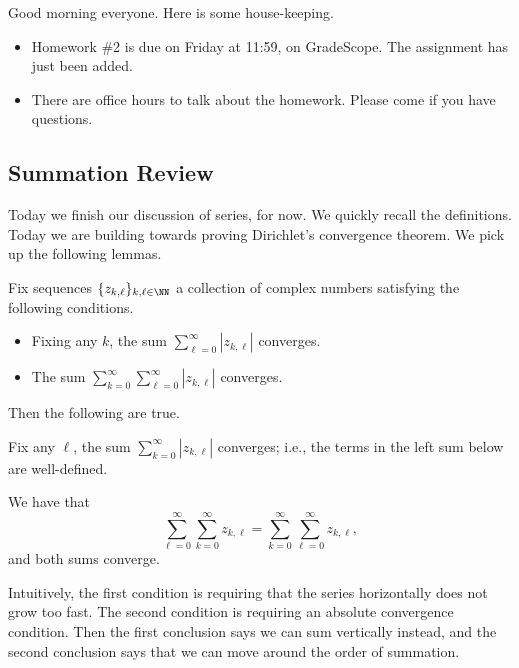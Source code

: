 \documentclass[../notes.tex]{subfiles}
\begin{document}

Good morning everyone. Here is some house-keeping.
\begin{itemize}
	\item Homework \#2 is due on Friday at 11:59, on GradeScope. The assignment has just been added.
	\item There are office hours to talk about the homework. Please come if you have questions.
\end{itemize}

\subsection{Summation Review}
Today we finish our discussion of series, for now. We quickly recall the definitions.
\seriesdefi*
\convergedefi*
Today we are building towards proving Dirichlet's convergence theorem. We pick up the following lemmas.
\begin{lemma} \label{lem:doublesums}
	Fix sequences $\{z_{k,\ell}\}_{k,\ell\in\NN}$ a collection of complex numbers satisfying the following conditions.
	\begin{itemize}
		\item Fixing any $k$, the sum $\sum_{\ell=0}^\infty|z_{k,\ell}|$ converges.
		\item The sum $\sum_{k=0}^\infty\sum_{\ell=0}^\infty|z_{k,\ell}|$ converges.
	\end{itemize}
	Then the following are true.
	\begin{listalph}
		\item Fix any $\ell$, the sum $\sum_{k=0}^\infty|z_{k,\ell}|$ converges; i.e., the terms in the left sum below are well-defined.
		\item We have that
		\[\sum_{\ell=0}^\infty\sum_{k=0}^\infty z_{k,\ell}=\sum_{k=0}^\infty\sum_{\ell=0}^\infty z_{k,\ell},\]
		and both sums converge.
	\end{listalph}
\end{lemma}
Intuitively, the first condition is requiring that the series horizontally does not grow too fast. The second condition is requiring an absolute convergence condition. Then the first conclusion says we can sum vertically instead, and the second conclusion says that we can move around the order of summation.
\end{document}
